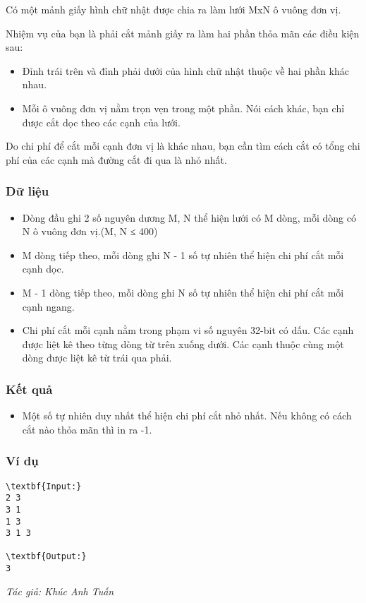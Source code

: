 

Có một mảnh giấy hình chữ nhật được chia ra làm lưới MxN ô vuông đơn vị.

Nhiệm vụ của bạn là phải cắt mảnh giấy ra làm hai phần thỏa mãn các điều kiện sau:
\begin{itemize}
	\item Đỉnh trái trên và đỉnh phải dưới của hình chữ nhật thuộc về hai phần khác nhau.
	\item Mỗi ô vuông đơn vị nằm trọn vẹn trong một phần. Nói cách khác, bạn chỉ được cắt dọc theo các cạnh của lưới.
\end{itemize}

Do chi phí để cắt mỗi cạnh đơn vị là khác nhau, bạn cần tìm cách cắt có tổng chi phí của các cạnh mà đường cắt đi qua là nhỏ nhất.

\subsubsection{Dữ liệu}
\begin{itemize}
	\item Dòng đầu ghi 2 số nguyên dương M, N thể hiện lưới có M dòng, mỗi dòng có N ô vuông đơn vị.(M, N ≤ 400)
	\item M dòng tiếp theo, mỗi dòng ghi N - 1 số tự nhiên thể hiện chi phí cắt mỗi cạnh dọc.
	\item M - 1 dòng tiếp theo, mỗi dòng ghi N số tự nhiên thể hiện chi phí cắt mỗi cạnh ngang.
	\item Chi phí cắt mỗi cạnh nằm trong phạm vi số nguyên 32-bit có dấu. Các cạnh được liệt kê theo từng dòng từ trên xuống dưới. Các cạnh thuộc cùng một dòng được liệt kê từ trái qua phải.
\end{itemize}

\subsubsection{Kết quả}
\begin{itemize}
	\item Một số tự nhiên duy nhất thể hiện chi phí cắt nhỏ nhất. Nếu không có cách cắt nào thỏa mãn thì in ra -1.
\end{itemize}

\subsubsection{Ví dụ}
\begin{verbatim}
\textbf{Input:}
2 3
3 1
1 3
3 1 3

\textbf{Output:}
3
\end{verbatim}

\emph{Tác giả: Khúc Anh Tuấn }